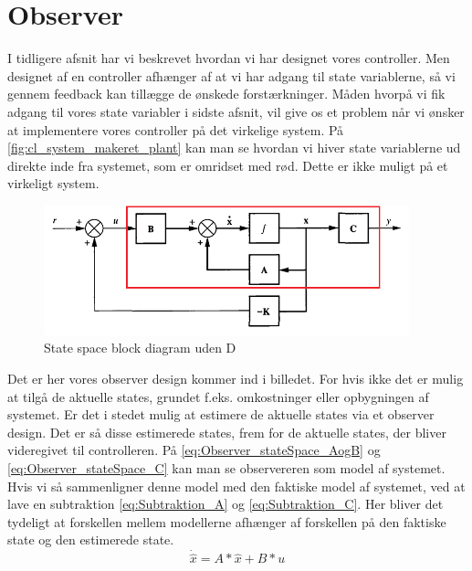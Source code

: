 \graphicspath{{Chapters/Observer/}}

\section{Observer}
I tidligere afsnit har vi beskrevet hvordan vi har designet vores controller. Men designet af en controller afhænger af at vi har adgang til state variablerne, så vi gennem feedback kan tillægge de ønskede forstærkninger. Måden hvorpå vi fik adgang til vores state variabler i sidste afsnit, vil give os et problem når vi ønsker at implementere vores controller på det virkelige system. På \autoref{fig:cl_system_makeret_plant} kan man se hvordan vi hiver state variablerne ud direkte inde fra systemet, som er omridset med rød. Dette er ikke muligt på et virkeligt system.

\begin{figure}[H]
	\centering
	\includegraphics[width = 300pt]{Img/cl_system_makeret_plant.PNG}
	\caption{State space block diagram uden D}
	\label{fig:cl_system_makeret_plant}
\end{figure}


Det er her vores observer design kommer ind i billedet. For hvis ikke det er mulig at tilgå de aktuelle states, grundet f.eks. omkostninger eller opbygningen af systemet. Er det i stedet mulig at estimere de aktuelle states via et observer design. Det er så disse estimerede states, frem for de aktuelle states, der bliver videregivet til controlleren.
På \autoref{eq:Observer_stateSpace_AogB} og \autoref{eq:Observer_stateSpace_C} kan man se observereren som model af systemet. Hvis vi så sammenligner denne model med den faktiske model af systemet, ved at lave en subtraktion \autoref{eq:Subtraktion_A} og \autoref{eq:Subtraktion_C}. Her bliver det tydeligt at forskellen mellem modellerne afhænger af forskellen på den faktiske state og den estimerede state. 
\begin{equation}
\dot{\hat{x}} = A * \hat{x} + B * u
\label{eq:Observer_stateSpace_AogB}
\end{equation}

